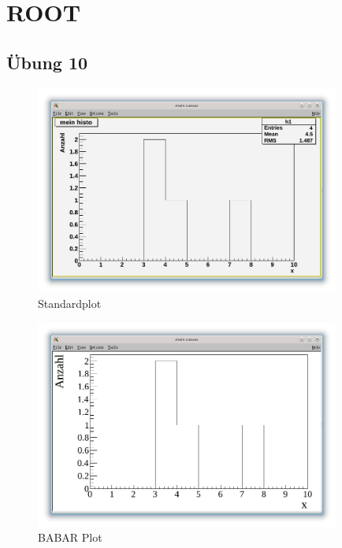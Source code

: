 
\part{ROOT}

\chapter{Übung 10}


\begin{figure}[h]
\begin{center}
\includegraphics[width=10cm]{Uebung_10/default.png}
\caption{Standardplot}
\end{center}
\end{figure}



\begin{figure}[h]
\begin{center}
\includegraphics[width=10cm]{Uebung_10/babar.png}
\caption{BABAR Plot}
\end{center}
\end{figure}


